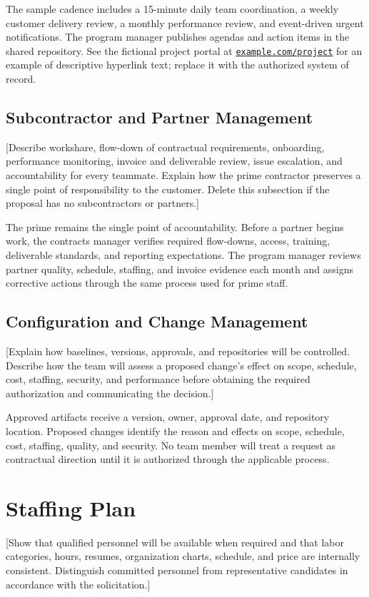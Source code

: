 The sample cadence includes a 15-minute daily team coordination, a weekly
customer delivery review, a monthly performance review, and event-driven urgent
notifications. The program manager publishes agendas and action items in the
shared repository. See the fictional project portal at
\href{https://example.com/project}{\texttt{example.com/project}} for an example
of descriptive hyperlink text; replace it with the authorized system of record.

\subsection{Subcontractor and Partner Management}
[Describe workshare, flow-down of contractual requirements, onboarding,
performance monitoring, invoice and deliverable review, issue escalation, and
accountability for every teammate. Explain how the prime contractor preserves
a single point of responsibility to the customer. Delete this subsection if
the proposal has no subcontractors or partners.]

The prime remains the single point of accountability. Before a partner begins
work, the contracts manager verifies required flow-downs, access, training,
deliverable standards, and reporting expectations. The program manager reviews
partner quality, schedule, staffing, and invoice evidence each month and assigns
corrective actions through the same process used for prime staff.

\subsection{Configuration and Change Management}
[Explain how baselines, versions, approvals, and repositories will be
controlled. Describe how the team will assess a proposed change's effect on
scope, schedule, cost, staffing, security, and performance before obtaining
the required authorization and communicating the decision.]

Approved artifacts receive a version, owner, approval date, and repository
location. Proposed changes identify the reason and effects on scope, schedule,
cost, staffing, quality, and security. No team member will treat a request as
contractual direction until it is authorized through the applicable process.

\section{Staffing Plan}
\label{sec:staffing}
[Show that qualified personnel will be available when required and that labor
categories, hours, resumes, organization charts, schedule, and price are
internally consistent. Distinguish committed personnel from representative
candidates in accordance with the solicitation.]

